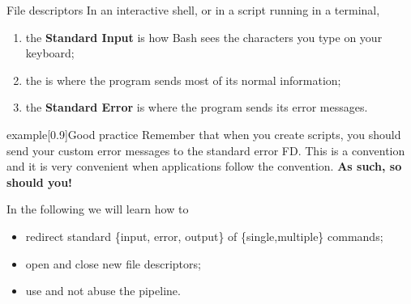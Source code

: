 \begin{frame}{File descriptors}
    \vspace{-3mm}
    In an interactive shell, or in a script running in a terminal,
    \begin{enumerate}\addtocounter{enumi}{-1}
        \item the \textbf{Standard Input} is how Bash sees the characters you type on your keyboard;
        \item the  is where the program sends most of its normal information;
        \item the \alert{\textbf{Standard Error}} is where the program sends its error messages.
    \end{enumerate}
    \begin{varblock}{example}[0.9\textwidth]{Good practice}
        Remember that when you create scripts, you should send your custom error messages to the standard error FD.
        This is a convention and it is very convenient when applications follow the convention. \textbf{As such, so should you!}
    \end{varblock}
    \medskip
    In the following we will learn how to
    \begin{itemize}
        \item redirect standard \{input, error, output\} of \{single,multiple\} commands;
        \item open and close new file descriptors;
        \item use and not abuse the pipeline.
    \end{itemize}
\end{frame}
